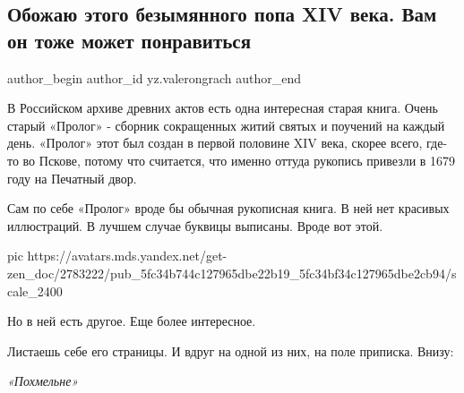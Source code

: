 
 
 
 
 
 
\subsection{Обожаю этого безымянного попа XIV века. Вам он тоже может понравиться}
\label{sec:29_11_2020.sites.ru.zen_yandex.yz.valerongrach.1.pop_14_vek}
\ifcmt
	author_begin
   author_id yz.valerongrach
	author_end
\fi


В Российском архиве древних актов есть одна интересная старая книга. Очень
старый «Пролог» - сборник сокращенных житий святых и поучений на каждый день.
«Пролог» этот был создан в первой половине XIV века, скорее всего, где-то во
Пскове, потому что считается, что именно оттуда рукопись привезли в 1679 году
на Печатный двор.

Сам по себе «Пролог» вроде бы обычная рукописная книга. В ней нет красивых
иллюстраций. В лучшем случае буквицы выписаны. Вроде вот этой.

\ifcmt
pic https://avatars.mds.yandex.net/get-zen_doc/2783222/pub_5fc34b744c127965dbe22b19_5fc34bf34c127965dbe2cb94/scale_2400
\fi

Но в ней есть другое. Еще более интересное.

Листаешь себе его страницы. И вдруг на одной из них, на поле приписка. Внизу:

\begin{leftbar}
	\begingroup
		\em «Похмельне»
	\endgroup
\end{leftbar}

